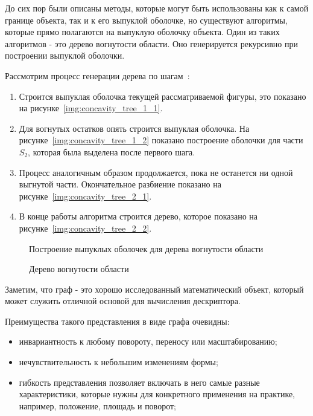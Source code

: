 До сих пор были описаны методы, которые могут быть использованы как к самой границе объекта, так и к его выпуклой оболочке, но существуют алгоритмы, которые прямо полагаются на выпуклую оболочку объекта. Один из таких алгоритмов - это дерево вогнутости области. Оно генерируется рекурсивно при построении выпуклой оболочки.

Рассмотрим процесс генерации дерева по шагам~\cite{sonka2014image}:
\begin{enumerate}
	\item Строится выпуклая оболочка текущей рассматриваемой фигуры, это показано на рисунке~\ref{img:concavity_tree_1_1}.
	\item Для вогнутых остатков опять строится выпуклая оболочка. На рисунке~\ref{img:concavity_tree_1_2} показано построение оболочки для части $S_2$, которая была выделена после первого шага.
	\item Процесс аналогичным образом продолжается, пока не останется ни одной выгнутой части. Окончательное разбиение показано на рисунке~\ref{img:concavity_tree_2_1}.
	\item В конце работы алгоритма строится дерево, которое показано на рисунке~\ref{img:concavity_tree_2_2}.
\end{enumerate}

\begin{figure}
	{\centering
		\hfill
		\subbottom[\label{img:concavity_tree_1_1}]{%
			}
		\hfill
		\subbottom[\label{img:concavity_tree_1_2}]{%
			}
		\hfill
	}
	\caption{Построение выпуклых оболочек для дерева вогнутости области}
	\label{img:concavity_tree_1}
\end{figure}

\begin{figure}
	{\centering
		\hfill
		\subbottom[\label{img:concavity_tree_2_1}]{%
			}
		\hfill
		\subbottom[\label{img:concavity_tree_2_2}]{%
			}
		\hfill
	}
	\caption{Дерево вогнутости области}
	\label{img:concavity_tree_2}
\end{figure}

Заметим, что граф - это хорошо исследованный математический объект, который может служить отличной основой для вычисления дескриптора.

Преимущества такого представления в виде графа очевидны:
\begin{itemize}
	\item инвариантность к любому повороту, переносу или масштабированию;
	\item нечувствительность к небольшим изменениям формы;
	\item гибкость представления позволяет включать в него самые разные характеристики, которые нужны для конкретного применения на практике, например, положение, площадь и поворот;
\end{itemize}

